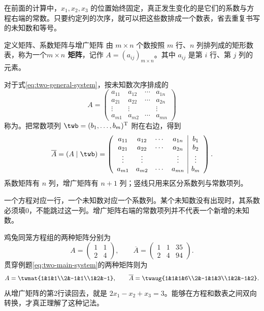 \documentclass[a4paper,12pt,twoside,openany,fontset=none]{ctexbook}
\newcounter{definition}[chapter]
\newenvironment{definition}[1][]{\begin{defBox}{定义}{#1}}{\end{defBox}}
\numberwithin{equation}{chapter}
\begin{document}
在前面的计算中，$x_1,x_2,x_3$ 的位置始终固定，真正发生变化的是它们的系数与方程右端的常数。只要约定列的次序，就可以把这些数排成一个数表，省去重复书写的未知数和等号。

\begin{definition}[矩阵、系数矩阵与增广矩阵]
由 $m\times n$ 个数按照 $m$ 行、$n$ 列排列成的矩形数表，称为一个\textbf{$m\times n$ 矩阵}，记作 $A=(a_{ij})_{m\times n}$。其中 $a_{ij}$ 是第 $i$ 行、第 $j$ 列的元素。

对于式\eqref{eq:two-general-system}，按未知数次序排成的
\[
 A=\left(\begin{array}{cccc}
 a_{11}&a_{12}&\cdots&a_{1n}\\
 a_{21}&a_{22}&\cdots&a_{2n}\\
 \vdots&\vdots&&\vdots\\
 a_{m1}&a_{m2}&\cdots&a_{mn}
 \end{array}\right)
\]
称为\textbf{}。把常数项列 $\twb=(b_1,\ldots,b_m)^{\mathrm T}$ 附在右边，得到\textbf{}
\[
 \overline A=(A\mid\twb)
 =\left(\begin{array}{cccc|c}
 a_{11}&a_{12}&\cdots&a_{1n}&b_1\\
 a_{21}&a_{22}&\cdots&a_{2n}&b_2\\
 \vdots&\vdots&&\vdots&\vdots\\
 a_{m1}&a_{m2}&\cdots&a_{mn}&b_m
 \end{array}\right).
\]
系数矩阵有 $n$ 列，增广矩阵有 $n+1$ 列；竖线只用来区分系数列与常数项列。
\end{definition}

一个方程对应一行，一个未知数对应一个系数列。某个未知数没有出现时，其系数必须填0，不能跳过这一列。增广矩阵右端的常数项列并不代表一个新增的未知数。

鸡兔同笼方程组的两种矩阵分别为
\[
 A=\left(\begin{array}{rr}1&1\\2&4\end{array}\right),
 \qquad
 \overline A=\left(\begin{array}{rr|r}1&1&35\\2&4&94\end{array}\right).
\]
贯穿例题\eqref{eq:two-main-system}的两种矩阵则为
\[
 A=\twmat{1&1&1\\2&-1&1\\1&2&-1},
 \qquad
 \overline A=\twaug{1&1&1&6\\2&-1&1&3\\1&2&-1&2}.
\]
从增广矩阵的第2行读回去，就是 $2x_1-x_2+x_3=3$。能够在方程和数表之间双向转换，才真正理解了这种记法。
\end{document}
